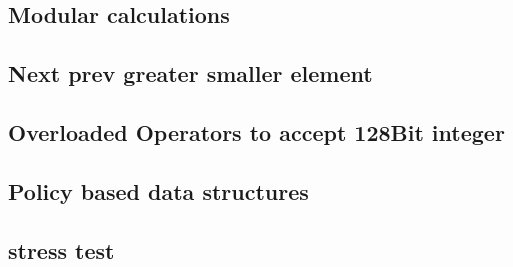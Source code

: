 \subsection{Modular calculations}
\raggedbottom
\hrulefill
\subsection{Next prev greater smaller element}
\raggedbottom
\hrulefill
\subsection{Overloaded Operators to accept 128Bit integer}
\raggedbottom
\hrulefill
\subsection{Policy based data structures}
\raggedbottom
\hrulefill
\subsection{stress test}
\raggedbottom
\hrulefill
